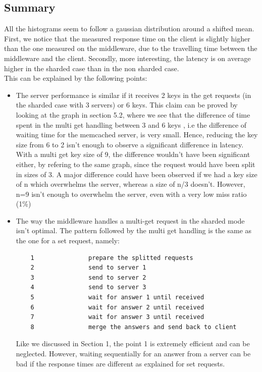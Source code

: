 \documentclass[11pt,a4paper]{article}
\begin{document}
\subsection{Summary}

All the histograms seem to follow a gaussian distribution around a shifted mean. First, we notice that the measured response time on the client is slightly higher than the one measured on the middleware, due to the travelling time between the middleware and the client. Secondly, more interesting, the latency is on average higher in the sharded case than in the non sharded case. 
\\
This can be explained by the following points: 
\begin{itemize}
\item The server performance is similar if it receives 2 keys in the get requests (in the sharded case with 3 servers) or 6 keys. This claim can be proved by looking at the graph in section 5.2, where we see that the difference of time spent in the multi get handling between 3 and 6 keys , i.e the difference of waiting time for the memcached server, is very small. Hence, reducing the key size from 6 to 2 isn't enough to observe a significant difference in latency. 
With a multi get key size of 9, the difference wouldn't have been significant either, by refering to the same graph, since the request would have been split in sizes of 3. A major difference could have been observed if we had a key size of n which overwhelms the server, whereas a size of n/3 doesn't. However, n=9 isn't enough to overwhelm the server, even with a very low miss ratio (1\%)
\item The way the middleware handles a multi-get request in the sharded mode isn't optimal. The pattern followed by the multi get handling is the same as the one for a set request, namely: 
\begin{lstlisting}
	1				prepare the splitted requests
	2				send to server 1
	3				send to server 2
	4				send to server 3
	5				wait for answer 1 until received
	6				wait for answer 2 until received
	7				wait for answer 3 until received
	8				merge the answers and send back to client
\end{lstlisting}
Like we discussed in Section 1, the point 1 is extremely efficient and can be neglected. However, waiting sequentially for an answer from a server can be bad if the response times are different as explained for set requests. 
\end{itemize}  

\newpage
\end{document}
